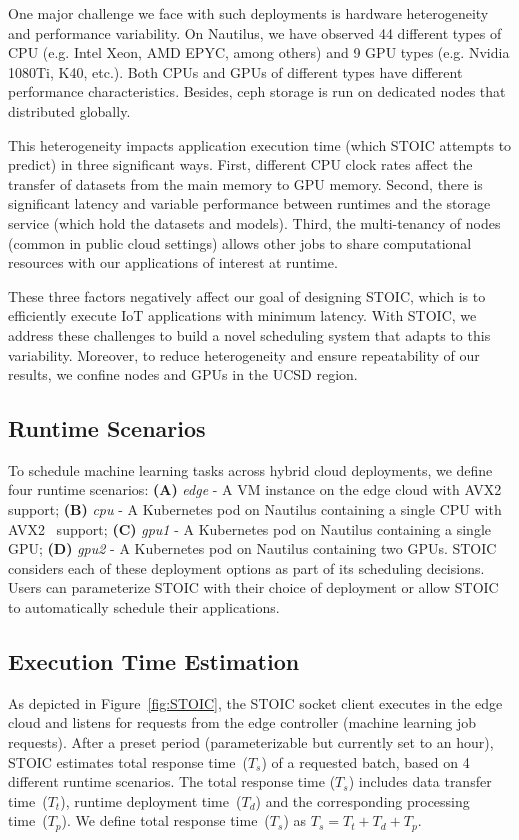 One major challenge we face with such deployments is hardware heterogeneity and performance variability. On Nautilus, we have observed 44 different types of CPU (e.g. Intel Xeon, AMD EPYC, among others) and 9 GPU types (e.g. Nvidia 1080Ti, K40, etc.). Both CPUs and GPUs of different types have different performance characteristics. Besides, ceph storage is run on dedicated nodes that distributed globally.

This heterogeneity impacts application execution time (which STOIC attempts to predict) in three significant ways. First, different CPU clock rates affect the transfer of datasets from the main memory to GPU memory. Second, there is significant latency and variable performance between runtimes and the storage service (which hold the datasets and models). Third, the multi-tenancy of nodes (common in public cloud settings) allows other jobs to share computational resources with our applications of interest at runtime. 

These three factors negatively affect our goal of designing STOIC, which is to efficiently execute IoT applications with minimum latency. With STOIC, we address these challenges to build a novel scheduling system that adapts to this variability. Moreover, to reduce heterogeneity and ensure repeatability of our results, we confine nodes and GPUs in the UCSD region.

\subsection{Runtime Scenarios}
To schedule machine learning tasks across hybrid cloud deployments, we define four runtime scenarios: \textbf{(A)} \textit{edge} - A VM instance on the edge cloud with AVX2~\cite{ref:avx} support; \textbf{(B)} \textit{cpu} - A Kubernetes pod on Nautilus containing a single CPU with AVX2~\cite{ref:avx} support; \textbf{(C)} \textit{gpu1} - A Kubernetes pod on Nautilus containing a single GPU; \textbf{(D)} \textit{gpu2} - A Kubernetes pod on Nautilus containing two GPUs. 
STOIC considers each of these deployment options as part of its scheduling decisions. Users can parameterize STOIC with their choice of deployment or allow STOIC to automatically schedule their applications.


\subsection{Execution Time Estimation}
 As depicted in Figure~\ref{fig:STOIC}, 
the STOIC socket client executes in the edge 
cloud and listens for requests from the edge controller (machine learning job requests). After a preset period (parameterizable but currently set to an hour), STOIC estimates total response time~($T_s$) of a requested batch, based on 4 different runtime scenarios. The total response time ($T_s$) includes data transfer time~($T_t$), runtime deployment time~($T_d$) and the corresponding processing time~($T_p$). We define total response time~($T_s$) as $T_s = T_t + T_d + T_p$.
 
